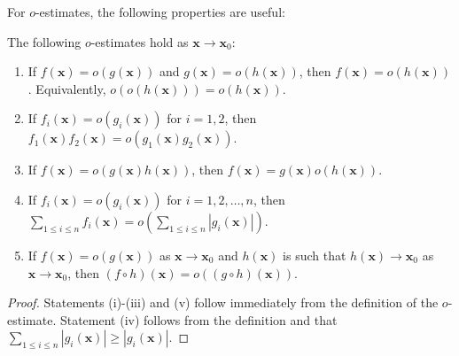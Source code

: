       For $o$-estimates, the following properties are useful:

      \begin{proposition}\label{prop:Little_Oh_manipulations}
          The following $o$-estimates hold as $\mathbf{x} \to \mathbf{x}_{0}$:
          \begin{enumerate}[label=(\roman*)]
            \item If $f(\mathbf{x}) = o(g(\mathbf{x}))$ and $g(\mathbf{x}) = o(h(\mathbf{x}))$, then $f(\mathbf{x}) = o(h(\mathbf{x}))$. Equivalently, $o(o(h(\mathbf{x}))) = o(h(\mathbf{x}))$.
            \item If $f_{i}(\mathbf{x}) = o(g_{i}(\mathbf{x}))$ for $i = 1,2$, then $f_{1}(\mathbf{x})f_{2}(\mathbf{x}) = o(g_{1}(\mathbf{x})g_{2}(\mathbf{x}))$.
            \item If $f(\mathbf{x}) = o(g(\mathbf{x})h(\mathbf{x}))$, then $f(\mathbf{x}) = g(\mathbf{x})o(h(\mathbf{x}))$.
            \item If $f_{i}(\mathbf{x}) = o(g_{i}(\mathbf{x}))$ for $i = 1,2,\ldots,n$, then $\sum_{1 \le i \le n}f_{i}(\mathbf{x}) = o\left(\sum_{1 \le i \le n}|g_{i}(\mathbf{x})|\right)$.
            \item If $f(\mathbf{x}) = o(g(\mathbf{x}))$ as $\mathbf{x} \to \mathbf{x}_{0}$ and $h(\mathbf{x})$ is such that $h(\mathbf{x}) \to \mathbf{x}_{0}$ as $\mathbf{x} \to \mathbf{x}_{0}$, then $(f \circ h)(\mathbf{x}) = o((g \circ h)(\mathbf{x}))$.
          \end{enumerate}
      \end{proposition}
      \begin{proof}
        Statements (i)-(iii) and (v) follow immediately from the definition of the $o$-estimate. Statement (iv) follows from the definition and that $\sum_{1 \le i \le n}|g_{i}(\mathbf{x})| \ge |g_{i}(\mathbf{x})|$.
      \end{proof}
